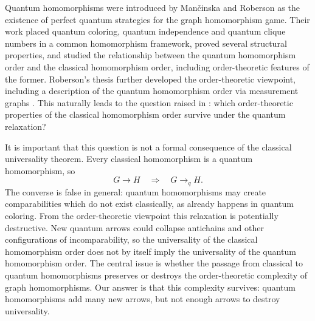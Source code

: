 \documentclass[11pt]{amsart}
\theoremstyle{plain}
\theoremstyle{definition}
\newcommand{\toq}{\to_q}
\begin{document}
Quantum homomorphisms were introduced by Man\v{c}inska and Roberson \cite{MRQuantumHom} as the existence of perfect quantum strategies for the graph homomorphism game.  Their work placed quantum coloring, quantum independence and quantum clique numbers in a common homomorphism framework, proved several structural properties, and studied the relationship between the quantum homomorphism order and the classical homomorphism order, including order-theoretic features of the former.  Roberson's thesis further developed the order-theoretic viewpoint, including a description of the quantum homomorphism order via measurement graphs \cite{RobersonThesis}.  This naturally leads to the question raised in \cite{MRQuantumHom}: which order-theoretic properties of the classical homomorphism order survive under the quantum relaxation?

It is important that this question is not a formal consequence of the classical universality theorem.  Every classical homomorphism is a quantum homomorphism, so
\[
   G\to H \quad\Longrightarrow\quad G\toq H.
\]
The converse is false in general: quantum homomorphisms may create comparabilities which do not exist classically, as already happens in quantum coloring.  From the order-theoretic viewpoint this relaxation is potentially destructive.  New quantum arrows could collapse antichains and other configurations of incomparability, so the universality of the classical homomorphism order does not by itself imply the universality of the quantum homomorphism order.  The central issue is whether the passage from classical to quantum homomorphisms preserves or destroys the order-theoretic complexity of graph homomorphisms.  Our answer is that this complexity survives: quantum homomorphisms add many new arrows, but not enough arrows to destroy universality.
\end{document}
